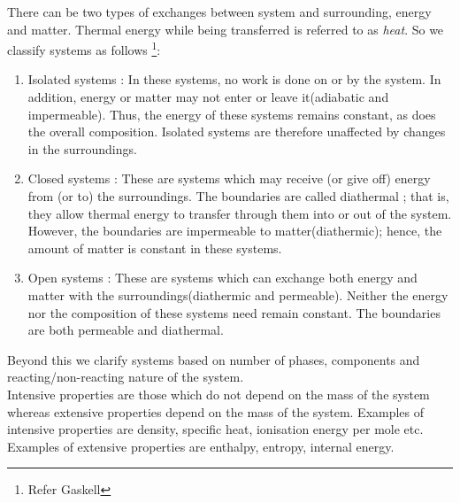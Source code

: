 \documentclass[12pt]{article}
\begin{document}
    There can be two types of exchanges between system and surrounding, energy and matter. Thermal energy while being transferred is referred to as \textit{heat}. So we classify systems as follows \footnote[1]{Refer Gaskell}:
    \begin{enumerate}
    	\item Isolated systems : In these systems, no work is done on or by the system. In addition,
    	energy or matter may not enter or leave it(adiabatic and impermeable). Thus, the energy of these systems
    	remains constant, as does the overall composition. Isolated systems are therefore
    	unaffected by changes in the surroundings.
    	
    	\item Closed systems : These are systems which may receive (or give off) energy from
    	(or to) the surroundings. The boundaries are called diathermal ; that is, they allow
    	thermal energy to transfer through them into or out of the system. However, the boundaries are impermeable to matter(diathermic); hence, the amount of matter is constant in
    	these systems.
    	
    	\item Open systems : These are systems which can exchange both energy and matter with
    	the surroundings(diathermic and permeable). Neither the energy nor the composition of these systems need
    	remain constant. The boundaries are both permeable and diathermal.
    \end{enumerate}

        Beyond this we clarify systems based on number of phases, components and reacting/non-reacting nature of the system. \\
        
        Intensive properties are those which do not depend on the mass of the system whereas extensive properties depend on the mass of the system. Examples of intensive properties are density, specific heat, ionisation energy per mole etc. Examples of extensive properties are enthalpy, entropy, internal energy.\\
        
\end{document}
